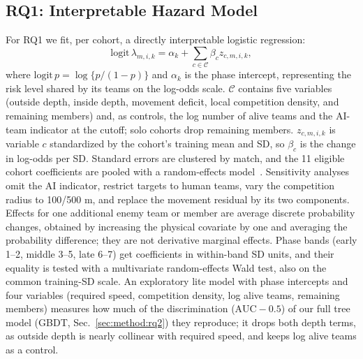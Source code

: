 \documentclass[sigconf,anonymous,nonacm]{acmart}
\begin{document}
\subsection{RQ1: Interpretable Hazard Model}
\label{sec:method:rq1}
For RQ1 we fit, per cohort, a directly interpretable logistic regression:
\begin{equation}
\mathrm{logit}\,\lambda_{m,i,k}=\alpha_k+\textstyle\sum_{c\in\mathcal{C}}\beta_c z_{c,m,i,k},
\label{eq:ehm}
\end{equation}
where $\mathrm{logit}\,p=\log\{p/(1-p)\}$ and $\alpha_k$ is the phase intercept, representing the risk level shared by its teams on the log-odds scale.
$\mathcal{C}$ contains five variables (outside depth, inside depth, movement deficit, local competition density, and remaining members) and, as controls, the log number of alive teams and the AI-team indicator at the cutoff; solo cohorts drop remaining members.
$z_{c,m,i,k}$ is variable $c$ standardized by the cohort's training mean and SD, so $\beta_c$ is the change in log-odds per SD.
Standard errors are clustered by match, and the 11 eligible cohort coefficients are pooled with a random-effects model~\cite{DerSimonian86}. Sensitivity analyses omit the AI indicator, restrict targets to human teams, vary the competition radius to 100/500 m, and replace the movement residual by its two components. Effects for one additional enemy team or member are average discrete probability changes, obtained by increasing the physical covariate by one and averaging the probability difference; they are not derivative marginal effects.
Phase bands (early 1--2, middle 3--5, late 6--7) get coefficients in within-band SD units, and their equality is tested with a multivariate random-effects Wald test, also on the common training-SD scale.
An exploratory lite model with phase intercepts and four variables (required speed, competition density, log alive teams, remaining members) measures how much of the discrimination ($\mathrm{AUC}-0.5$) of our full tree model (GBDT, Sec.~\ref{sec:method:rq2}) they reproduce; it drops both depth terms, as outside depth is nearly collinear with required speed, and keeps log alive teams as a control.
\end{document}
